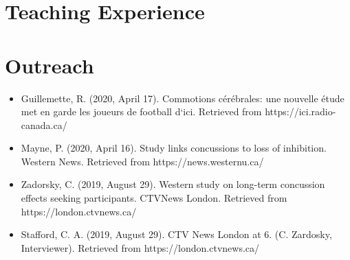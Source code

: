 \documentclass[letterpaper]{twentysecondcv} %
\begin{document}

\section{Teaching Experience}

\begin{twenty} %
\end{twenty}


\section{Outreach}

\begin{itemize}
	\item Guillemette, R. (2020, April 17). Commotions c\'er\'ebrales: une nouvelle \'etude met en garde les joueurs de football d`ici. Retrieved from https://ici.radio-canada.ca/
	\item Mayne, P. (2020, April 16). Study links concussions to loss of inhibition. Western News. Retrieved from https://news.westernu.ca/
	\item Zadorsky, C. (2019, August 29). Western study on long-term concussion effects seeking participants. CTVNews London. Retrieved from https://london.ctvnews.ca/
	\item Stafford, C. A. (2019, August 29). CTV News London at 6. (C. Zardosky, Interviewer). Retrieved from https://london.ctvnews.ca/
\end{itemize}


\end{document}
